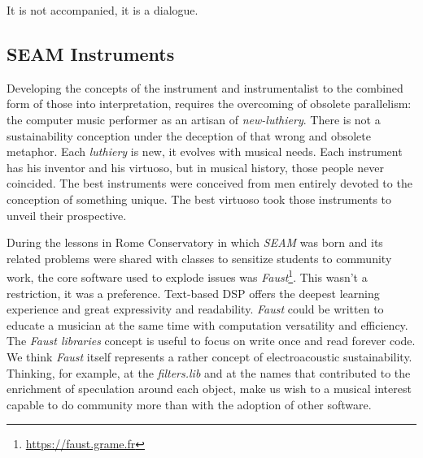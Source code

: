 \documentclass[twoside,a4paper]{article}
\begin{document}
It is not accompanied, it is a dialogue.


\subsection{SEAM Instruments}

Developing the concepts of the instrument and instrumentalist to the combined
form of those into interpretation, \cite{lem16,mp01,savi85} requires the
overcoming of obsolete parallelism: the computer music performer as an artisan
of \emph{new-luthiery}. There is not a sustainability conception under the
deception of that wrong and obsolete metaphor. Each \emph{luthiery} is new, it
evolves with musical needs. Each instrument has his inventor and his virtuoso,
but in musical history, those people never coincided. The best instruments were
conceived from men entirely devoted to the conception of something unique. The
best virtuoso took those instruments to unveil their prospective.


During the lessons in Rome Conservatory in which \emph{SEAM} was born and its
related problems were shared with classes to sensitize students to community
work, the core software used to explode issues was
\emph{Faust}\footnote{\url{https://faust.grame.fr}}. This wasn't a restriction,
it was a preference. Text-based DSP offers the deepest learning experience and
great expressivity and readability. \emph{Faust} could be written to educate a
musician at the same time with computation versatility and efficiency. The
\emph{Faust libraries} concept is useful to focus on write once and read forever
code. We think \emph{Faust} itself represents a rather concept of electroacoustic
sustainability. Thinking, for example, at the \emph{filters.lib} and at the names
that contributed to the enrichment of speculation around each object, make us
wish to a musical interest capable to do community more than with the adoption
of other software.
\end{document}
